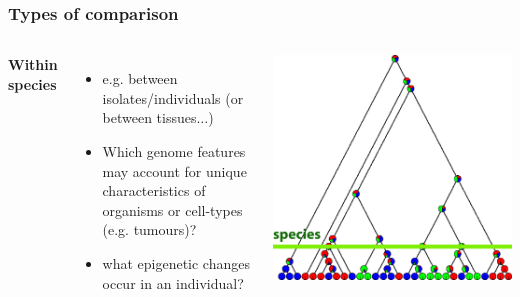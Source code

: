 
%
\begin{frame}
  \frametitle{Types of comparison}
    \begin{columns}[T] 
        \textcolor{RawSienna}{\textbf{Within species}}
        \begin{itemize}
	  \item e.g. between isolates/individuals (or between tissues$\ldots$)
	  \item \textcolor{hutton_green}{Which genome features may account for unique characteristics of organisms or cell-types (e.g. tumours)?}
	  \item \textcolor{hutton_blue}{what epigenetic changes occur in an individual?}
	\end{itemize}
        \includegraphics[width=\textwidth]{images/cladogram_species}
    \end{columns}  
\end{frame}

